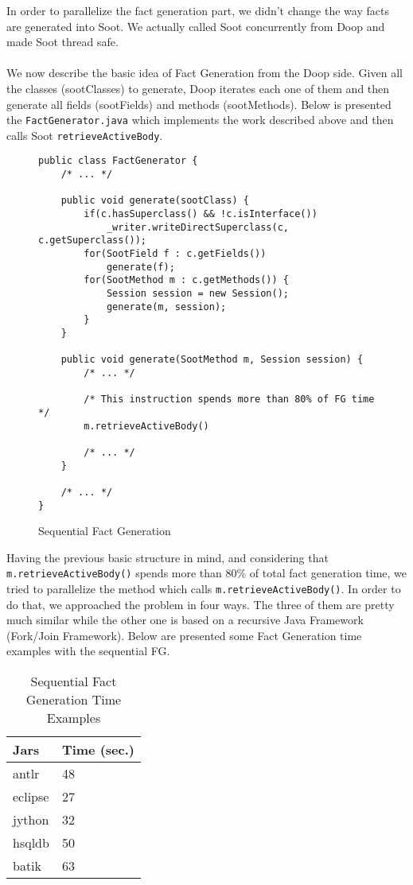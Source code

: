 \documentclass{dithesis}
\begin{document}
    In order to parallelize the fact generation part, we didn't change the way facts are generated into Soot. We actually called Soot concurrently from Doop and made Soot thread safe.\\
    \\
    We now describe the basic idea of Fact Generation from the Doop side. Given all the classes (sootClasses) to generate, Doop iterates each one of them and then generate all fields (sootFields) and methods (sootMethods). Below is presented the \texttt{FactGenerator.java} which implements the work described above and then calls Soot \texttt{retrieveActiveBody}.
    \begin{figure}[H]
\begin{lstlisting}
public class FactGenerator {
    /* ... */

    public void generate(sootClass) {
        if(c.hasSuperclass() && !c.isInterface())
            _writer.writeDirectSuperclass(c, c.getSuperclass());
        for(SootField f : c.getFields())
            generate(f);
        for(SootMethod m : c.getMethods()) {
            Session session = new Session();
            generate(m, session);
        }
    }

    public void generate(SootMethod m, Session session) {
        /* ... */

        /* This instruction spends more than 80% of FG time */
        m.retrieveActiveBody()

        /* ... */
    }

    /* ... */
}
\end{lstlisting}
    \caption{Sequential Fact Generation}
    \end{figure}

    Having the previous basic structure in mind, and considering that \texttt{m.retrieveActiveBody()} spends more than 80\% of total fact generation time, we tried to parallelize the method which calls \texttt{m.retrieveActiveBody()}. In order to do that, we approached the problem in four ways. The three of them are pretty much similar while the other one is based on a recursive Java Framework (Fork/Join Framework). Below are presented some Fact Generation time examples with the sequential FG.
    \begin{table}[H]
		\centering
        \begin{tabular}{@{}ll@{}}
        \toprule
        \textbf{Jars} & \textbf{Time (sec.)} \\ \midrule
        antlr          & 48                    \\
        eclipse        & 27                    \\
        jython         & 32                    \\
        hsqldb         & 50                    \\
        batik          & 63                    \\ \bottomrule
        \end{tabular}
        \newline
		\caption{Sequential Fact Generation Time Examples}
	\end{table}
\end{document}
